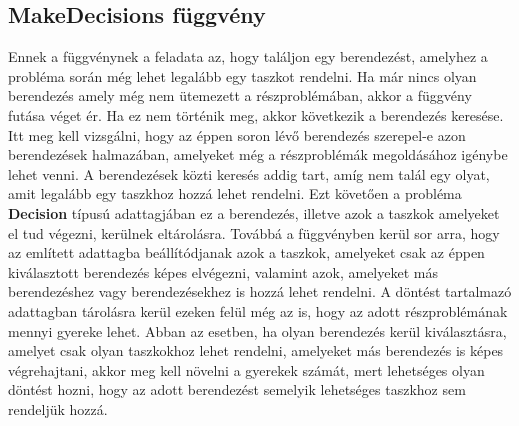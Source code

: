 \subsection{MakeDecisions függvény}
Ennek a függvénynek a feladata az, hogy találjon egy berendezést, amelyhez a probléma során még lehet legalább egy taszkot rendelni. Ha már nincs olyan berendezés amely még nem ütemezett a részproblémában, akkor a függvény futása véget ér.
Ha ez nem történik meg, akkor következik a berendezés keresése.
Itt meg kell vizsgálni, hogy az éppen soron lévő berendezés szerepel-e azon berendezések halmazában, amelyeket még a részproblémák megoldásához igénybe lehet venni.
A berendezések közti keresés addig tart, amíg nem talál egy olyat, amit legalább egy taszkhoz hozzá lehet rendelni.
Ezt követően a probléma \textbf{Decision} típusú adattagjában ez a berendezés, illetve azok a taszkok amelyeket el tud végezni, kerülnek eltárolásra.
Továbbá a függvényben kerül sor arra, hogy az említett adattagba beállítódjanak azok a taszkok, amelyeket csak az éppen kiválasztott berendezés képes elvégezni, valamint azok, amelyeket más berendezéshez vagy berendezésekhez is hozzá lehet rendelni.
A döntést tartalmazó adattagban tárolásra kerül ezeken felül még az is, hogy az adott részproblémának mennyi gyereke lehet.
Abban az esetben, ha olyan berendezés kerül kiválasztásra, amelyet csak olyan taszkokhoz lehet rendelni, amelyeket más berendezés is képes végrehajtani, akkor meg kell növelni a gyerekek számát, mert lehetséges olyan döntést hozni, hogy az adott berendezést semelyik lehetséges taszkhoz sem rendeljük hozzá.
 
